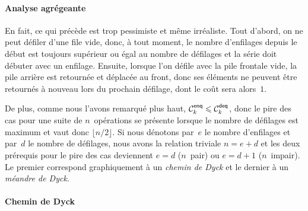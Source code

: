 \paragraph{Analyse agrégeante}

En fait, ce qui précède est trop pessimiste et même irréaliste. Tout
d'abord, on ne peut défiler d'une file vide, donc, à tout moment, le
nombre d'enfilages depuis le début est toujours supérieur ou égal au
nombre de défilages et la série doit débuter avec un
enfilage. Ensuite, lorsque l'on défile avec la pile frontale vide, la
pile arrière est retournée et déplacée au front, donc ses éléments ne
peuvent être retournés à nouveau lors du prochain défilage, dont le
coût sera alors~\(1\).

De plus, comme nous l'avons remarqué plus haut, \(\C{\fun{enq}}{k}
\leqslant \C{\fun{deq}}{k}\), donc le pire des cas pour une suite de
\(n\)~opérations se présente lorsque le nombre de défilages est
maximum et vaut donc \(\lfloor{n/2}\rfloor\). Si nous dénotons
par~\(e\) le nombre d'enfilages et par~\(d\) le nombre de défilages,
nous avons la relation triviale \(n = e + d\) et les deux prérequis
pour le pire des cas deviennent \(e=d\) (\(n\)~pair) ou \(e=d+1\)
(\(n\)~impair). Le premier correspond graphiquement à un \emph{chemin
  de Dyck} et le dernier à un \emph{méandre de
  Dyck}.

\paragraph{Chemin de Dyck}

